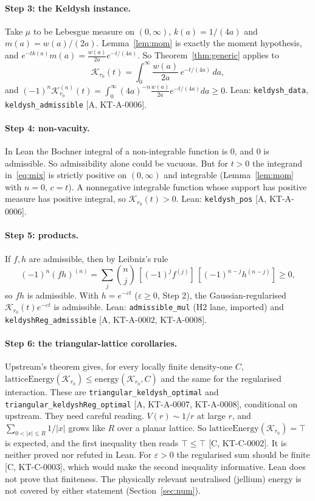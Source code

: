 \documentclass[11pt]{article}
\theoremstyle{remark}
\newcommand{\tier}[1]{\textsf{[#1]}}
\newcommand{\lean}[1]{\texttt{#1}}
\begin{document}
\paragraph{Step 3: the Keldysh instance.} Take $\mu$ to be Lebesgue measure on $(0,\infty)$, $k(a)=1/(4a)$ and
$m(a)=w(a)/(2a)$. Lemma~\ref{lem:mom} is exactly the moment hypothesis, and
$e^{-tk(a)}m(a)=\frac{w(a)}{2a}e^{-t/(4a)}$. So Theorem~\ref{thm:generic} applies to
\begin{equation}\label{eq:mix}
\mathcal K_{r_0}(t)=\int_0^\infty\frac{w(a)}{2a}\,e^{-t/(4a)}\,da ,
\end{equation}
and $(-1)^n\mathcal K^{(n)}_{r_0}(t)=\int_0^\infty (4a)^{-n}\frac{w(a)}{2a}e^{-t/(4a)}da\ge0$. Lean:
\lean{keldysh\_data}, \lean{keldysh\_admissible} \tier{A, KT-A-0006}.

\paragraph{Step 4: non-vacuity.} In Lean the Bochner integral of a non-integrable function is $0$, and $0$ is
admissible. So admissibility alone could be vacuous. But for $t>0$ the integrand in~\eqref{eq:mix} is strictly positive
on $(0,\infty)$ and integrable (Lemma~\ref{lem:mom} with $n=0$, $c=t$). A nonnegative integrable function whose support
has positive measure has positive integral, so $\mathcal K_{r_0}(t)>0$. Lean: \lean{keldysh\_pos}
\tier{A, KT-A-0006}.

\paragraph{Step 5: products.} If $f,h$ are admissible, then by Leibniz's rule
\[(-1)^n(fh)^{(n)}=\textstyle\sum_j\binom nj\,[(-1)^jf^{(j)}]\,[(-1)^{n-j}h^{(n-j)}]\ge0,\]
so $fh$ is admissible. With
$h=e^{-\varepsilon t}$ ($\varepsilon\ge0$, Step 2), the Gaussian-regularised
$\mathcal K_{r_0}(t)e^{-\varepsilon t}$ is admissible. Lean: \lean{admissible\_mul} (H2 lane, imported) and
\lean{keldyshReg\_admissible} \tier{A, KT-A-0002, KT-A-0008}.

\paragraph{Step 6: the triangular-lattice corollaries.} Upstream's theorem gives, for every locally finite density-one
$C$, $\mathrm{latticeEnergy}(\mathcal K_{r_0})\le\mathrm{energy}(\mathcal K_{r_0},C)$ and the same for the regularised
interaction. These are \lean{triangular\_keldysh\_optimal} and \lean{triangular\_keldyshReg\_optimal}
\tier{A, KT-A-0007, KT-A-0008}, conditional on upstream. They need careful reading. $V(r)\sim1/r$ at large $r$, and
$\sum_{0<|x|\le R}1/|x|$ grows like $R$ over a planar lattice. So $\mathrm{latticeEnergy}(\mathcal K_{r_0})=\top$ is
expected, and the first inequality then reads $\top\le\top$ \tier{C, KT-C-0002}. It is neither proved nor refuted in
Lean. For $\varepsilon>0$ the regularised sum should be finite \tier{C, KT-C-0003}, which would make the second
inequality informative. Lean does not prove that finiteness. The physically relevant neutralised (jellium) energy is
not covered by either statement (Section~\ref{sec:num}).
\end{document}
